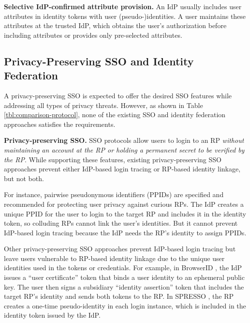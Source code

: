 
\noindent\textbf{Selective IdP-confirmed attribute provision.}
An IdP usually includes user attributes in identity tokens \cite{OpenIDConnect,rfc6749} with user (pseudo-)identities.
A user maintains these attributes at the trusted IdP,
which obtains the user's authorization before including attributes or provides only pre-selected attributes.

\subsection{Privacy-Preserving SSO and Identity Federation}
\label{subsec-solutions}

A privacy-preserving SSO is expected to offer the desired SSO features while addressing all types of privacy threats. However, as shown in
Table \ref{tbl:comparison-protocol}, none of the existing SSO and identity federation approaches satisfies the requirements.

\noindent\textbf{Privacy-preserving SSO.} SSO protocols \cite{OpenIDConnect,rfc6749, SAML, SAMLIdentifier} allow users to login to an RP \emph{without maintaining an account at the RP or holding a permanent secret to be verified by the RP}. While supporting these features, existing privacy-preserving SSO approaches \cite{BrowserID, SPRESSO, NIST2017draft} prevent either IdP-based login tracing or RP-based identity linkage, but not both. %

For instance, pairwise pseudonymous identifiers (PPIDs) are specified \cite{OpenIDConnect, SAMLIdentifier} and recommended \cite{NIST2017draft}
for protecting user privacy against curious RPs. The IdP creates a unique PPID for the user to login to the target RP and includes it in the identity token, so colluding RPs cannot link the user's identities. But it cannot prevent IdP-based login tracing because the IdP needs the RP's identity to assign PPIDs.

Other privacy-preserving SSO approaches prevent IdP-based login tracing but leave users vulnerable to RP-based identity linkage due to the unique user identities used in the tokens or credentials. For example, in BrowserID \cite{BrowserID}, %
the IdP %
issues a ``user certificate'' token that binds a user identity to an ephemeral public key. The user then signs a subsidiary ``identity assertion'' token that includes the target RP's identity and sends both tokens to the RP.
In SPRESSO \cite{SPRESSO}, the RP creates a one-time pseudo-identity in each login instance, which is included in the identity token issued by the IdP. %

